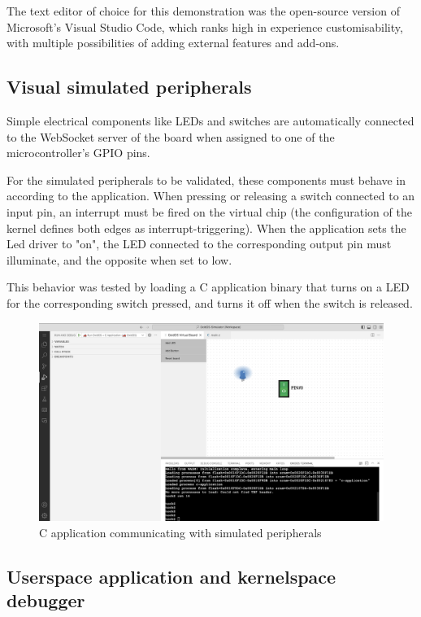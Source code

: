 \documentclass[12pt,a4paper]{report}
\begin{document}
The text editor of choice for this demonstration was the open-source version of Microsoft's Visual Studio Code, which ranks high in experience customisability, with multiple possibilities of adding external features and add-ons.

\subsection{Visual simulated peripherals}

Simple electrical components like LEDs and switches are automatically connected to the WebSocket server of the board when assigned to one of the microcontroller's GPIO pins.

For the simulated peripherals to be validated, these components must behave in according to the application. When pressing or releasing a switch connected to an input pin, an interrupt must be fired on the virtual chip (the configuration of the kernel defines both edges as interrupt-triggering).
When the application sets the Led driver to "on", the LED connected to the corresponding output pin must illuminate, and the opposite when set to low.

This behavior was tested by loading a C application binary that turns on a LED for the corresponding switch pressed, and turns it off when the switch is released.

\begin{figure}[H]
\centering
\includegraphics[scale=0.30]{pics/vscode_platform.png}
  \caption[C application communicating with simulated peripherals]{C application communicating with simulated peripherals}
  \label{fig:platform}
\end{figure}

\subsection{Userspace application and kernelspace debugger}
\end{document}
